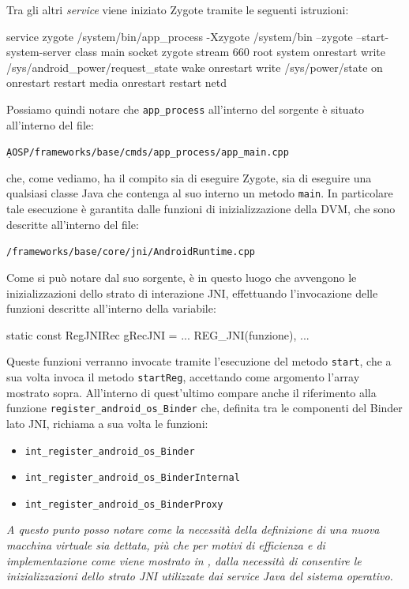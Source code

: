 Tra gli altri \textit{service} viene iniziato Zygote tramite le seguenti istruzioni:
\begin{bash}
service zygote /system/bin/app_process -Xzygote /system/bin --zygote --start-system-server
    class main
    socket zygote stream 660 root system
    onrestart write /sys/android_power/request_state wake
    onrestart write /sys/power/state on
    onrestart restart media
    onrestart restart netd
\end{bash}
Possiamo quindi notare che \texttt{\small app\_process} all'interno del sorgente
è situato all'interno del file:
\begin{center}
\texttt{\small \d AOSP/frameworks/base/cmds/app\_process/app\_main.cpp}
\end{center}
che, come vediamo, ha il compito sia di eseguire Zygote, sia di eseguire
una qualsiasi classe Java che contenga al suo interno un metodo \texttt{\small main}.
In particolare tale esecuzione è garantita dalle funzioni di inizializzazione
della DVM, che sono descritte all'interno del file:
\begin{center}
\texttt{\small \AOSP/frameworks/base/core/jni/AndroidRuntime.cpp}
\end{center}

Come si può notare dal suo sorgente, è in questo luogo che avvengono le inizializzazioni
dello strato di interazione JNI, effettuando l'invocazione delle funzioni
descritte all'interno della variabile:
\begin{clang}
static const RegJNIRec gRecJNI = {
   ...  REG_JNI(funzione), ...
}
\end{clang}
Queste funzioni verranno invocate tramite l'esecuzione del metodo \texttt{\small start},
che a sua volta invoca il metodo \texttt{\small startReg}, accettando come argomento
l'array mostrato sopra. All'interno di quest'ultimo compare anche il riferimento
alla funzione \texttt{\small register\_android\_os\_Binder} che, definita tra le componenti
del Binder lato JNI, richiama a sua volta le funzioni:
\begin{itemize}
\item \texttt{\small int\_register\_android\_os\_Binder}
\item \texttt{\small int\_register\_android\_os\_BinderInternal}
\item \texttt{\small int\_register\_android\_os\_BinderProxy}
\end{itemize}

\textit{A questo punto posso notare come la necessità della definizione di una 
nuova macchina virtuale sia dettata, più che per motivi di efficienza e 
di implementazione come viene mostrato in \parencite[9-11]{libro:carli}, 
dalla necessità di consentire le inizializzazioni dello strato JNI utilizzate
dai \textrm{service} Java del sistema operativo. }

